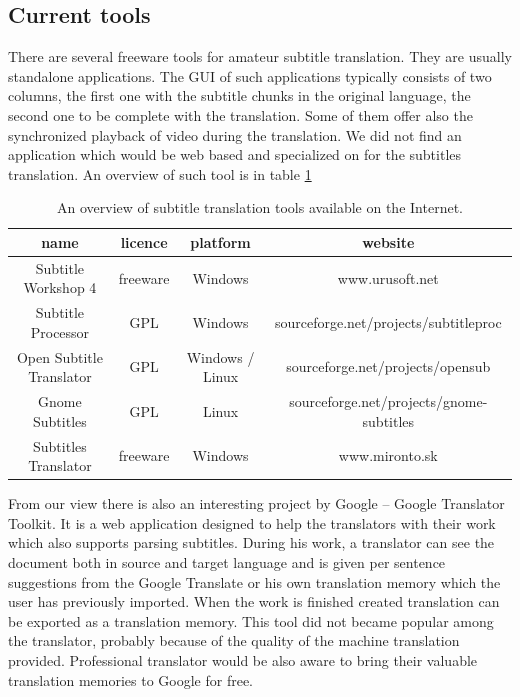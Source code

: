 \subsection{Current tools}

There are several freeware tools for amateur subtitle translation. They are usually standalone applications. The GUI of such applications typically consists of two columns, the first one with the subtitle chunks in the original language, the second one to be complete with the translation. Some of them offer also the synchronized playback of video during the translation. We did not find an application which would be web based and specialized on for the subtitles translation. An overview of such tool is in table \ref{subtitles_tools}

\begin{table}[h]

\begin{center}
\begin{tabular}{|c|c|c|c|}
\hline
\bf name & \bf licence & \bf platform & \bf website \\
\hline
Subtitle Workshop 4 & freeware & Windows & www.urusoft.net \\
\hline
Subtitle Processor & GPL & Windows & sourceforge.net/projects/subtitleproc \\
\hline
Open Subtitle Translator & GPL & Windows / Linux & sourceforge.net/projects/opensub \\
\hline
Gnome Subtitles & GPL & Linux & sourceforge.net/projects/gnome-subtitles \\
\hline
Subtitles Translator & freeware & Windows & www.mironto.sk \\ \hline

\end{tabular}
\end{center}

\caption{An overview of subtitle translation tools available on the Internet.} \label{subtitles_tools}
\end{table}

From our view there is also an interesting project by Google -- Google Translator Toolkit. It is a web application designed to help the translators with their work which also supports parsing subtitles. During his work, a translator can see the document both in source and target language and is given per sentence suggestions from the Google Translate or his own translation memory which the user has previously imported. When the work is finished created translation can be exported as a translation memory. This tool did not became popular among the translator, probably because of the quality of the machine translation provided. Professional translator would be also aware to bring their valuable translation memories to Google for free. 

